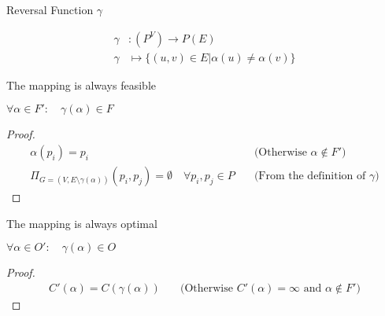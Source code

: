 \documentclass{article}
\begin{document}
\begin{definition}
Reversal Function $\gamma$

\begin{align}
	\nonumber \gamma & : (P^V) \rightarrow P(E) \\
	\nonumber \gamma & \mapsto \{(u,v) \in E | \alpha(u) \neq \alpha(v)\}
\end{align}
\end{definition}

\begin{lemma}
The mapping is always feasible

$\forall \alpha \in F' : \quad \gamma(\alpha) \in F$
\end{lemma}

\begin{proof}
\begin{align}
	\nonumber \alpha(p_i) = p_i & \quad \mbox{(Otherwise $\alpha \not\in F'$)} \\
	\nonumber \Pi_{G=(V, E \setminus \gamma(\alpha))} (p_i, p_j) = \emptyset  \quad \forall p_i, p_j \in P & \quad \mbox{(From the definition of $\gamma$)}
\end{align}
\end{proof}

\begin{lemma}
The mapping is always optimal

$\forall \alpha \in O' : \quad \gamma(\alpha) \in O$
\end{lemma}

\begin{proof}
\begin{align}
	\nonumber C'(\alpha) = C(\gamma(\alpha)) & \quad \mbox{(Otherwise $C'(\alpha) = \infty$ and $\alpha \not\in F'$)}
\end{align}
\end{proof}



\end{document}
